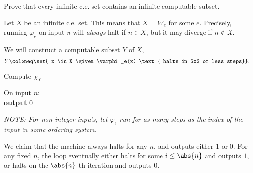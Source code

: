 \begin{problem}
  Prove that every infinite c.e. set contains an infinite computable subset.

  \begin{answer}
    Let $X$ be an infinite c.e. set.
    This means that $X = W_e$ for some $e$.
    Precisely, running $\varphi_e$ on input $n$ will \emph{always}
    halt if $n \in X$, but it may diverge if $n \not \in X$.

    We will construct a computable subset $Y$ of $X$,
    \[ Y \coloneq \set{ x \in X \given \varphi_e(x) \text{ halts in $x$ or less steps}}. \]

    \step
    \begin{algorithm}[H]\label{alg:Y}
      \caption{Compute $\chi_Y$}
      On input $n$: \\
      \textbf{output} $0$
    \end{algorithm}

    \step
    \emph{
      NOTE: For non-integer inputs,
      let $\varphi_e$ run for as many steps as the index of the input
      in some ordering system.
    }

    \step
    We claim that the machine always halts for any $n$,
    and outputs either $1$ or $0$.
    For any fixed $n$, the loop eventually either halts for some $i \leq \abs{n}$
    and outputs $1$, or halts on the $\abs{n}$-th iteration and outputs $0$.

  \end{answer}
\end{problem}
